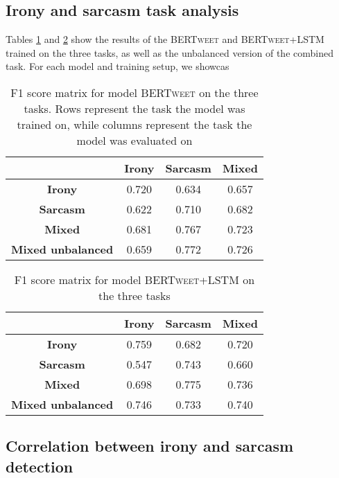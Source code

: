 \documentclass[10pt, a4paper]{article}
\begin{document}
\subsection{Irony and sarcasm task analysis}\label{task-analysis}

Tables \ref{tab:bertweet-results} and \ref{tab:bertweet-bilstm-results} show the results of the \textsc{BERTweet} and
\textsc{BERTweet+LSTM} trained on the three tasks, as well as the unbalanced version of the combined task. For each model
and training setup, we showcas

\begin{table}[h!]
   \centering
   \begin{tabular}{|c|c|c|c|}
       \hline
        & \textbf{Irony} & \textbf{Sarcasm} & \textbf{Mixed} \\ \hline
       \textbf{Irony} & 0.720 & 0.634 & 0.657 \\ \hline
       \textbf{Sarcasm} & 0.622 & 0.710 & 0.682 \\ \hline
       \textbf{Mixed} & 0.681 & 0.767 & 0.723 \\ \hline
       \textbf{Mixed unbalanced} & 0.659 & 0.772 & 0.726\\ \hline
   \end{tabular}
   \caption{F1 score matrix for model \textsc{BERTweet} on the three tasks. Rows represent the task the model was trained on, 
   while columns represent the task the model was evaluated on}
   \label{tab:bertweet-results}
\end{table}

\begin{table}[h!]
   \centering
   \begin{tabular}{|c|c|c|c|}
       \hline
       & \textbf{Irony} & \textbf{Sarcasm} & \textbf{Mixed} \\ \hline
       \textbf{Irony} & 0.759 & 0.682 & 0.720 \\ \hline
       \textbf{Sarcasm} & 0.547 & 0.743 & 0.660 \\ \hline
       \textbf{Mixed} & 0.698 & 0.775 & 0.736 \\ \hline
       \textbf{Mixed unbalanced} & 0.746 & 0.733 & 0.740\\ \hline
   \end{tabular}
   \caption{F1 score matrix for model \textsc{BERTweet+LSTM} on the three tasks}
   \label{tab:bertweet-bilstm-results}
\end{table}

\subsection{Correlation between irony and sarcasm detection}\label{correlation}
\end{document}
